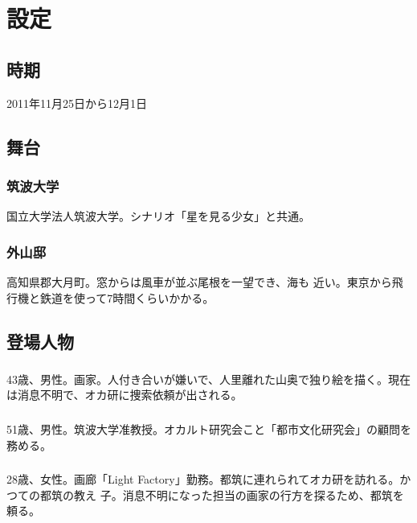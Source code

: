 \documentclass[a4paper,8pt,min]{jsarticle}
\begin{document}

\section{設定}
\subsection{時期}
2011年11月25日から12月1日

\subsection{舞台}
\subsubsection{筑波大学}
国立大学法人筑波大学。シナリオ「星を見る少女」と共通。

\subsubsection{外山邸}
高知県郡大月町。窓からは風車が並ぶ尾根を一望でき、海も
近い。東京から飛行機と鉄道を使って7時間くらいかかる。

\subsection{登場人物}
\subsubsection{}
43歳、男性。画家。人付き合いが嫌いで、人里離れた山奥で独り絵を描く。現在
は消息不明で、オカ研に捜索依頼が出される。

\subsubsection{} 
51歳、男性。筑波大学准教授。オカルト研究会こと「都市文化研究会」の顧問を務める。

\subsubsection{}
28歳、女性。画廊「Light Factory」勤務。都筑に連れられてオカ研を訪れる。かつての都筑の教え
子。消息不明になった担当の画家の行方を探るため、都筑を頼る。
\end{document}

